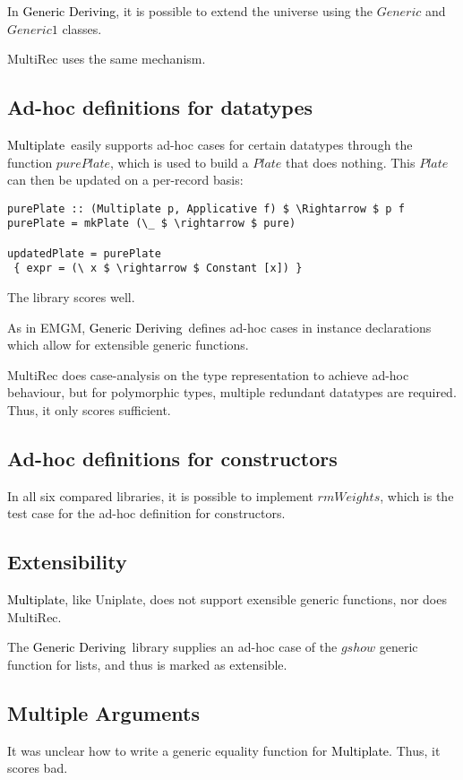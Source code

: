 \documentclass[twocolumn,11pt,a4paper]{article}
\newcommand{\multiplate}{\textcolor{black}{Multiplate}}
\newcommand{\genericderiving}{\textcolor{black}{Generic Deriving}}
\begin{document}
In \genericderiving, it is possible to extend the universe using the $ Generic $ and $ Generic1 $ classes.

MultiRec uses the same mechanism.

\subsection{Ad-hoc definitions for datatypes}
\multiplate\ easily supports ad-hoc cases for certain datatypes through the function $ purePlate $, which is used to build a $ Plate $ that does nothing.
This $ Plate $ can then be updated on a per-record basis:

\begin{lstlisting}[mathescape=true]
purePlate :: (Multiplate p, Applicative f) $ \Rightarrow $ p f
purePlate = mkPlate (\_ $ \rightarrow $ pure)

updatedPlate = purePlate 
 { expr = (\ x $ \rightarrow $ Constant [x]) }
\end{lstlisting}
The library scores well.

As in EMGM, \genericderiving\ defines ad-hoc cases in instance declarations which allow for extensible generic functions.

MultiRec does case-analysis on the type representation to achieve ad-hoc behaviour, but for polymorphic types, multiple redundant datatypes are required.
Thus, it only scores sufficient.

\subsection{Ad-hoc definitions for constructors}
In all six compared libraries, it is possible to implement $ rmWeights $, which is the test case for the ad-hoc definition for constructors.

\subsection{Extensibility}
\multiplate, like Uniplate, does not support exensible generic functions, nor does MultiRec.

The \genericderiving\ library supplies an ad-hoc case of the $ gshow $ generic function for lists, and thus is marked as extensible.

\subsection{Multiple Arguments}
It was unclear how to write a generic equality function for \multiplate.
Thus, it scores bad.
\end{document}
